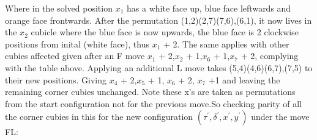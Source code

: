 \documentclass{article}
\begin{document}
\begin{figure}[hbt]
\centering
\RubikCubeSolvedWY
{}
\hspace{.5cm}
%
\hspace{.5cm}
\end{figure}
\begin{figure}[hbt]
\centering
\RubikCubeSolvedWY
{}%
\hspace{.5cm}
\end{figure}
Where in the solved position $x_1$ has a white face up, blue face leftwards and orange face frontwards. After the permutation (1,2)(2,7)(7,6),(6,1), it now lives in the $x_2$ cubicle where the blue face is now upwards, the blue face is 2 clockwise positions from inital (white face), thus $x_1$ + 2. The same applies with other cubies affected given after an F move $x_1$ + 2,$x_2$ + 1,$x_6$ + 1,$x_7$ + 2, complying with the table above. Applying an additional L move takes (5,4)(4,6)(6,7),(7,5) to their new positions. Giving $x_4$ + 2,$x_5$ + 1, $x_6$ + 2, $x_7$ +1 and leaving the remaining corner cubies unchanged. Note these x's are taken as permutations from the start configuration not for the previous move.\newline So checking parity of all the corner cubies in this for the new configuration $(\tau^{'},\delta^{'}, x^{'}, y^{'})$ under the move FL:
\end{document}
